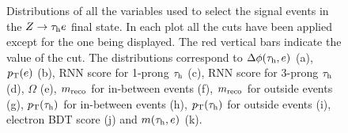 \begin{figure}[H]\ContinuedFloat
	\centering
	\hfill
	\hfill
	\caption{Distributions of all the variables used to select the signal events in the $Z\to\tau_\text{h} e$ final state. In each plot all the cuts have been applied except for the one being displayed. The red vertical bars indicate the value of the cut. The distributions correspond to $\Delta\phi(\tau_\text{h},e)$ (a), $p_\text{T}(e)$ (b), RNN score for 1-prong $\tau_\text{h}$ (c), RNN score for 3-prong $\tau_\text{h}$ (d), $\Omega$ (e), $m_{\text{reco}}$ for in-between events (f), $m_{\text{reco}}$ for outside events (g), $p_\text{T}(\tau_\text{h})$ for in-between events (h), $p_\text{T}(\tau_\text{h})$ for outside events (i), electron BDT score (j) and $m(\tau_\text{h},e)$ (k).}
	\label{Fig18}
\end{figure}
